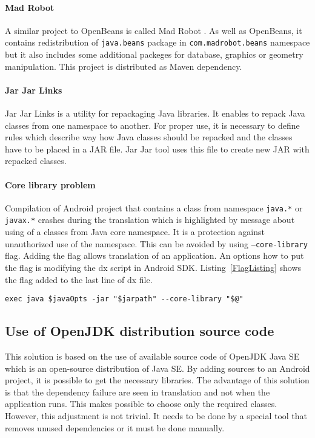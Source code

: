 \paragraph{Mad Robot}
A similar project to OpenBeans is called Mad Robot \cite{MadRobot}. As well as OpenBeans, it contains redistribution of
\texttt{java.beans} package in \texttt{com.madrobot.beans} namespace but it also includes some additional packeges for
database, graphics or geometry manipulation. This project is distributed as Maven dependency.

\paragraph{Jar Jar Links}
Jar Jar Links \cite{JarJar} is a utility for repackaging Java libraries. It enables to repack Java classes from one
namespace to another. For proper use, it is necessary to define rules which describe way how Java classes should be
repacked and the classes have to be placed in a JAR file. Jar Jar tool uses this file to create new JAR with repacked
classes.

\paragraph{Core library problem}
Compilation of Android project that contains a class from namespace \texttt{java.*} or \texttt{javax.*} crashes during
the translation which is highlighted by message about using of a classes from Java core namespace. It is a protection
against unauthorized use of the namespace. This can be avoided by using \texttt{--core-library} flag. Adding the flag
allows translation of an application. An options how to put the flag is modifying the dx script in Android SDK.
Listing~\ref{FlagListing} shows the flag added to the last line of dx file.
\\
\begin{lstlisting}[captionpos={b},caption={Core library flag in the last line of dx script.},frame={lines},
label={FlagListing},basicstyle=\footnotesize]
exec java $javaOpts -jar "$jarpath" --core-library "$@"
\end{lstlisting}

\subsection{Use of OpenJDK distribution source code}\label{OpenJdkDistrSection}
This solution is based on the use of available source code of OpenJDK Java SE \cite{OpenJDK} which is an open-source
distribution of Java SE. By adding sources to an Android project, it is possible to get the necessary libraries. The
advantage of this solution is that the dependency failure are seen in translation and not when the application runs.
This makes possible to choose only the required classes. However, this adjustment is not trivial. It needs to be done by
a special tool that removes unused dependencies or it must be done manually.

